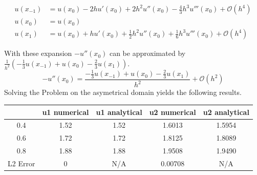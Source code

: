 \documentclass{article}
\begin{document}
\begin{align}
	u(x_{-1}) &= u(x_0) - 2h u'(x_0) + 2h^2u''(x_0)-\frac{4}{3}h^3u'''(x_0) +\mathcal{O}(h^4)\\
	u(x_{0}) &= u(x_0)\\
	u(x_{1}) &= u(x_0) +h u'(x_0) + \frac{1}{2}h^2u''(x_0)+\frac{1}{6}h^3u'''(x_0)+\mathcal{O}(h^4)
\end{align}

With these expansion $-u''(x_{0})$ can be approximated by $\frac{1}{h^2}(-\frac{1}{3}u(x_{-1})+u(x_{0})-\frac{2}{3}u(x_{1}))$. 
\begin{equation}
-u''(x_{0})=\frac{-\frac{1}{3} u(x_{-1}) + u(x_{0}) - \frac{2}{3} u(x_{1})}{h^2}+\mathcal{O}(h^2)
\end{equation}
Solving the Problem on the asymetrical domain yields the following results.
\begin{table}[H]
    \centering
    \begin{tabular}{c|c|c|c|c}
        & u1 numerical & u1 analytical & u2 numerical & u2 analytical \\ \hline
        0.4 & 1.52 & 1.52 & 1.6013 & 1.5954 \\ \hline
        0.6 & 1.72 & 1.72 & 1.8125 & 1.8089 \\ \hline
        0.8 & 1.88 & 1.88 & 1.9508 & 1.9490 \\ \hline
        L2 Error& $0$ & N/A &0.00708 & N/A
    \end{tabular}
\end{table}
\end{document}
